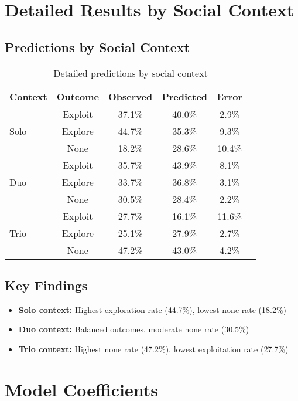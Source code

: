 \documentclass[11pt]{article}
\begin{document}
\section{Detailed Results by Social Context}

\subsection{Predictions by Social Context}

\begin{table}[h]
\centering
\begin{tabular}{lccccc}
\toprule
\textbf{Context} & \textbf{Outcome} & \textbf{Observed} & \textbf{Predicted} & \textbf{Error} \\
\midrule
\multirow{3}{*}{Solo} & Exploit & 37.1\% & 40.0\% & 2.9\% \\
& Explore & 44.7\% & 35.3\% & 9.3\% \\
& None & 18.2\% & 28.6\% & 10.4\% \\
\midrule
\multirow{3}{*}{Duo} & Exploit & 35.7\% & 43.9\% & 8.1\% \\
& Explore & 33.7\% & 36.8\% & 3.1\% \\
& None & 30.5\% & 28.4\% & 2.2\% \\
\midrule
\multirow{3}{*}{Trio} & Exploit & 27.7\% & 16.1\% & 11.6\% \\
& Explore & 25.1\% & 27.9\% & 2.7\% \\
& None & 47.2\% & 43.0\% & 4.2\% \\
\bottomrule
\end{tabular}
\caption{Detailed predictions by social context}
\end{table}

\subsection{Key Findings}

\begin{itemize}
    \item \textbf{Solo context:} Highest exploration rate (44.7\%), lowest none rate (18.2\%)
    \item \textbf{Duo context:} Balanced outcomes, moderate none rate (30.5\%)
    \item \textbf{Trio context:} Highest none rate (47.2\%), lowest exploitation rate (27.7\%)
\end{itemize}

\section{Model Coefficients}
\end{document}
